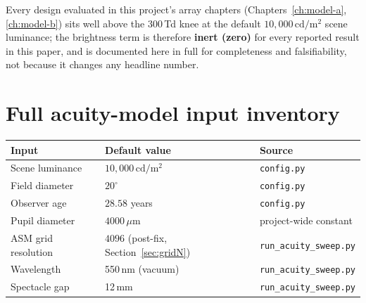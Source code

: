Every design evaluated in this project's array chapters (Chapters~\ref{ch:model-a},
\ref{ch:model-b}) sits well above the 300\,Td knee at the default $10{,}000\,\mathrm{cd/m^2}$
scene luminance; the brightness term is therefore \textbf{inert (zero)} for every
reported result in this paper, and is documented here in full for completeness and
falsifiability, not because it changes any headline number.

\section{Full acuity-model input inventory}
\begin{center}
\begin{tabular}{lll}
\toprule
Input & Default value & Source \\
\midrule
Scene luminance & $10{,}000\,\mathrm{cd/m^2}$ & \texttt{config.py} \\
Field diameter & $20^\circ$ & \texttt{config.py} \\
Observer age & $28.58$ years & \texttt{config.py} \\
Pupil diameter & $4000\,\mu$m & project-wide constant \\
ASM grid resolution & $4096$ (post-fix, Section~\ref{sec:gridN}) & \texttt{run\_acuity\_sweep.py} \\
Wavelength & 550\,nm (vacuum) & \texttt{run\_acuity\_sweep.py} \\
Spectacle gap & 12\,mm & \texttt{run\_acuity\_sweep.py} \\
\bottomrule
\end{tabular}
\end{center}

